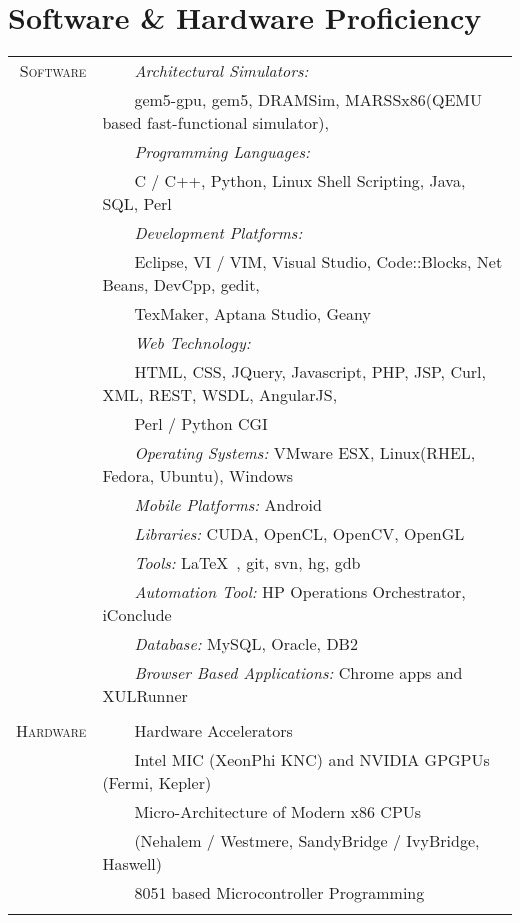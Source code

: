 \documentclass[a4paper,10pt]{article} %
\newcommand{\tabitem}{~~\llap{\textbullet}~~}
\begin{document}
\newpage

\section{Software \& Hardware Proficiency}
\begin{tabular}{rl}
\textsc{Software} & \tabitem \textit{Architectural Simulators:}\\
& ~~~~gem5-gpu, gem5, DRAMSim, MARSSx86(QEMU based fast-functional simulator),\\
& \tabitem \textit{Programming Languages:}\\
& ~~~~C / C++, Python, Linux Shell Scripting, Java, SQL, Perl\\
& \tabitem \textit{Development Platforms:} \\
& ~~~~Eclipse, VI / VIM, Visual Studio, Code::Blocks, Net Beans, DevCpp, gedit,\\
& ~~~~TexMaker, Aptana Studio, Geany\\	
& \tabitem \textit{Web Technology:} \\
& ~~~~HTML, CSS, JQuery, Javascript, PHP, JSP, Curl, XML, REST, WSDL, AngularJS,\\
& ~~~~Perl / Python CGI\\
& \tabitem \textit{Operating Systems:} VMware ESX, Linux(RHEL, Fedora, Ubuntu), Windows \\
& \tabitem \textit{Mobile Platforms:} Android \\
& \tabitem \textit{Libraries:} CUDA, OpenCL, OpenCV, OpenGL  \\
& \tabitem \textit{Tools:} \LaTeX\ , git, svn, hg, gdb\\
& \tabitem \textit{Automation Tool:} HP Operations Orchestrator, iConclude \\
& \tabitem \textit{Database:} MySQL, Oracle, DB2 \\
& \tabitem \textit{Browser Based Applications:} Chrome apps and XULRunner \\

&\\

\textsc{Hardware}  & \tabitem Hardware Accelerators \\
& ~~~~Intel MIC (XeonPhi KNC) and NVIDIA GPGPUs (Fermi, Kepler) \\
& \tabitem Micro-Architecture of Modern x86 CPUs\\
& ~~~~(Nehalem / Westmere, SandyBridge / IvyBridge, Haswell) \\ 
& \tabitem 8051 based Microcontroller Programming \\
&\\
\end{tabular}
\end{document}
